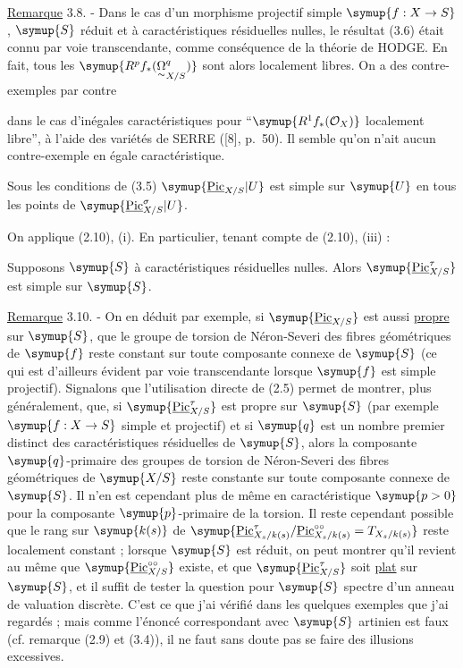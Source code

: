 \noindent\uline{Remarque} 3.8. - Dans le cas d'un morphisme projectif simple
$\symup{f:X\to S}$, $\symup{S}$ réduit et à caractéristiques résiduelles nulles,
le résultat (3.6) était connu par voie transcendante, comme conséquence de la
théorie de HODGE. En fait, tous les $\symup{R^pf_*(\mathord{\underset{\sim}{\Omega}}^q_{X/S})}$ sont alors
localement libres. On a des contre-exemples par contre

dans le cas d'inégales caractéristiques pour ``$\symup{R^1f_*(\mathcal O_X)}$
localement libre'', à l'aide des variétés de SERRE ([8], p.~50). Il semble
qu'on n'ait aucun contre-exemple en égale caractéristique.

 Sous les conditions de (3.5)
$\symup{\underline{\operatorname{Pic}}_{X/S}|U}$ est simple sur $\symup{U}$ en tous les points de
$\symup{\underline{\operatorname{Pic}}_{X/S}^\sigma|U}$.

On applique (2.10), (i). En particulier, tenant compte de (2.10), (iii) :

 Supposons $\symup{S}$ à caractéristiques résiduelles nulles.
Alors $\symup{\underline{\operatorname{Pic}}_{X/S}^\tau}$ est simple sur $\symup{S}$.

\noindent\uline{Remarque} 3.10. - On en déduit par exemple, si $\symup{\underline{\operatorname{Pic}}_{X/S}}$ est aussi \uline{propre} sur $\symup{S}$, que le groupe de torsion
de Néron-Severi des fibres géométriques de $\symup{f}$ reste constant sur toute
composante connexe de $\symup{S}$ (ce qui est d'ailleurs évident par voie transcendante
lorsque $\symup{f}$ est simple projectif). Signalons que l'utilisation directe de (2.5) permet de montrer, plus généralement, que, si $\symup{\underline{\operatorname{Pic}}_{X/S}^\tau}$ est propre sur $\symup{S}$ (par exemple $\symup{f:X\to S}$ simple et projectif) et si $\symup{q}$ est un nombre premier
distinct des caractéristiques résiduelles de $\symup{S}$, alors la composante
$\symup{q}$-primaire des groupes de torsion de Néron-Severi des fibres géométriques de
$\symup{X/S}$ reste constante sur toute composante connexe de $\symup{S}$. Il n'en est
cependant plus de même en caractéristique $\symup{p>0}$ pour la composante $\symup{p}$-primaire
de la torsion. Il reste cependant possible que le rang sur $\symup{k(s)}$ de $\symup{\underline{\operatorname{Pic}}_{X_s/k(s)}^\tau/\underline{\operatorname{Pic}}_{X_s/k(s)}^{\circ\circ}=T_{X_s/k(s)}}$ reste localement constant ; lorsque $\symup{S}$ est réduit, on peut montrer qu'il
revient au même que $\symup{\underline{\operatorname{Pic}}_{X/S}^{\circ\circ}}$ existe, et que
$\symup{\underline{\operatorname{Pic}}_{X/S}^\tau}$ soit \uline{plat} sur $\symup{S}$, et il suffit de tester la
question pour $\symup{S}$ spectre d'un anneau de valuation discrète. C'est ce que j'ai
vérifié dans les quelques exemples que j'ai regardés ; mais comme l'énoncé
correspondant avec $\symup{S}$ artinien est faux (cf. remarque (2.9) et (3.4)), il ne
faut sans doute pas se faire des illusions excessives.

